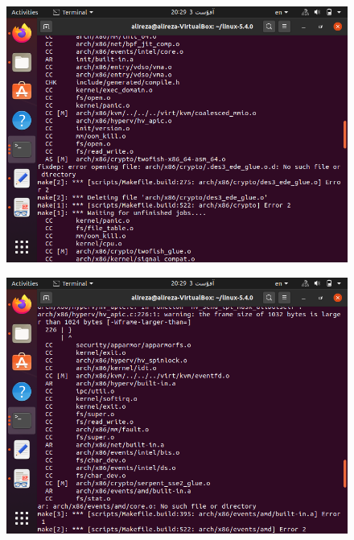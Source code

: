 \begin{itemize}
\begin{enumerate}
\begin{figure}[!hpbt]
 		 \end{figure}
 	  		 	\begin{figure}[!hpbt]
		 	 	\centering
		 	 	\includegraphics[scale=0.4]{img/pic13.png}
		 	 \end{figure}
	 	 \begin{figure}[!hpbt]
	 	 	\centering
	 	 	\includegraphics[scale=0.4]{img/pic14.png}
	 	 \end{figure}
 	 \begin{figure}[!hpbt]
 	 	\centering

\end{figure}
\end{enumerate}
\end{itemize}
